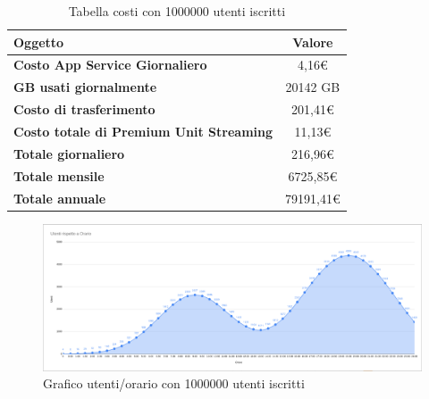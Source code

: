 \begin{table}[H]
    \label{tab:costi-1000000}
    \begin{tabularx}{\textwidth}{|X|c|}
        \hline
        \textbf{Oggetto} & \textbf{Valore} \\\hline
        
        \textbf{Costo App Service Giornaliero} & {4,16€} \\ 
        \hline
        \textbf{GB usati giornalmente} & {20142 GB} \\ 
        \hline
        \textbf{Costo di trasferimento} & {201,41€}\\
        \hline
        \textbf{Costo totale di Premium Unit Streaming} & {11,13€}\\  
        \hline
        \textbf{Totale giornaliero} & {216,96€}\\  
        \hline
        \textbf{Totale mensile} & {6725,85€}\\  
        \hline
        \textbf{Totale annuale} & {79191,41€}\\  
        \hline
    \end{tabularx}
    \caption{Tabella costi con 1000000 utenti iscritti}
\end{table}
\begin{figure}[H]
    \centering
    \includegraphics[scale=0.3]{images/costi/1000kuser.png}
    \caption{Grafico utenti/orario con 1000000 utenti iscritti}
    \label{fig:costi-1000000}
\end{figure}